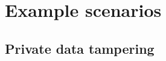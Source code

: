\documentclass[12pt]{article}
\begin{document}
    


    \section{Example scenarios}
    \label{sec:scenarios}


    \subsection{Private data tampering}




    
    
    \newpage
    
    
\end{document}

